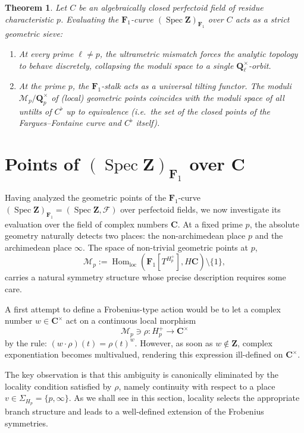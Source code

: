 \documentclass[11pt,a4paper]{article}
\newtheorem{theorem}{Theorem}[section]
\newcommand{\C}{\mathbf{C}}
\newcommand{\Q}{\mathbf{Q}}
\newcommand{\Z}{\mathbf{Z}}
\newcommand{\Fone}{\mathbf{F}_{1}}
\def\spz{\Spec \Z}
\def\spzf{(\Spec \Z)_{\mathbf{F}_{1}}}
\newcommand{\Spec}{\operatorname{Spec}}
\def\ie{{\it i.e.\/}\ }
\begin{document}
\begin{theorem}
Let $C$ be an algebraically closed perfectoid field of residue characteristic $p$. Evaluating the  $\Fone$-curve $\spzf$ over $C$ acts as a strict geometric sieve:
\begin{enumerate}
    \item At every prime $\ell \neq p$, the ultrametric mismatch forces the analytic topology to behave discretely, collapsing the moduli space to a single $\Q_\ell^\times$-orbit.
    \item At the prime $p$, the $\Fone$-stalk acts as a universal tilting functor. The moduli $\mathcal M_p/\Q_p^\times$ of (local) geometric points coincides with the moduli space of all untilts of $C^\flat$ up to equivalence (\ie the set of the closed points of the Fargues--Fontaine curve and $C^\flat$ itself).
\end{enumerate}
\end{theorem}


\section{Points of $\spzf$ over $\C$}\label{sect4}

Having analyzed the geometric points of the $\Fone$-curve $\spzf=(\spz,\mathcal F)$ over perfectoid fields, we now investigate its evaluation over the field of complex numbers $\C$. At a fixed prime $p$, the absolute geometry naturally detects two places: the non-archimedean place $p$ and the archimedean place $\infty$. The space of non-trivial geometric points at $p$,
\[
\mathcal{M}_{p}:=\operatorname{Hom}_{\mathrm{loc}}(\Fone[T^{H_p^+}],H\C)\setminus\{1\},
\]
carries a natural symmetry structure whose precise description requires some care.

A first attempt to define a Frobenius-type action would be to let a complex number $w\in\C^\times$ act on a continuous local morphism
\[
\mathcal M_p\ni\rho:H_p^+\to\C^\times
\]
by the rule:
$(w\cdot\rho)(t)=\rho(t)^w$.
However, as soon as $w\notin\Z$, complex exponentiation becomes multivalued, rendering this expression ill-defined on $\C^\times$.

The key observation is that this ambiguity is canonically eliminated by the locality condition satisfied by $\rho$, namely continuity with respect to a place
$v\in\Sigma_{H_p}=\{p,\infty\}$.
As we shall see in this section, locality selects the appropriate branch structure and leads to a well-defined extension of the Frobenius symmetries.\vspace{0.03in}
\end{document}
